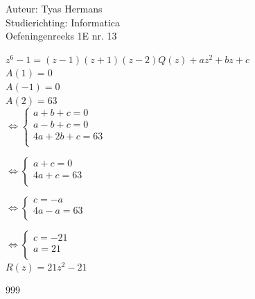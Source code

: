 \documentclass[a4paper]{article}
\begin{document}
  
\noindent \large Auteur: Tyas Hermans \\
\noindent \large Studierichting: Informatica\\
\noindent \large Oefeningenreeks 1E nr. 13\\

\medskip

\normalsize

$z^6-1 = (z-1)(z+1)(z-2)Q(z)+az^2+bz+c$\\

$ A(1) = 0$\\

$A(-1) = 0$\\

$A(2) = 63$\\

$\Leftrightarrow \left\{
\begin{array}{l}
a + b + c = 0 \\
a - b + c = 0 \\
4a + 2b + c = 63\\
\end{array}
\right.$

$\Leftrightarrow \left\{
\begin{array}{l}
a + c = 0 \\
4a + c = 63\\
\end{array}
\right.$

$\Leftrightarrow \left\{
\begin{array}{l}
c = -a \\
4a - a = 63\\
\end{array}
\right.$

$\Leftrightarrow \left\{
\begin{array}{l}
c = -21 \\
a = 21\\
\end{array}
\right.$\\

$R(z) = 21z^2 - 21$\\




\begin{thebibliography}{999}
\end{thebibliography}
\end{document}
